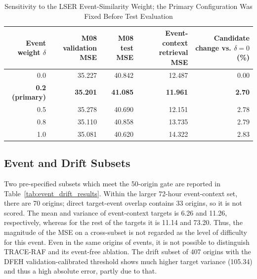 \documentclass{ieeeaccess}
\begin{document}
\begin{table}[!t]
\centering
\caption{Sensitivity to the LSER Event-Similarity Weight; the Primary
Configuration Was Fixed Before Test Evaluation}
\label{tab:event_weight_sensitivity}
\begin{tabular}{rrrrr}
\toprule
Event weight $\delta$ & M08 validation MSE & M08 test MSE & Event-context retrieval MSE & Candidate change vs. $\delta=0$ (\%) \\
\midrule
0.0 & 35.227 & 40.842 & 12.487 & 0.00 \\
\textbf{0.2 (primary)} & \textbf{35.201} & \textbf{41.085} & \textbf{11.961} & \textbf{2.70} \\
0.5 & 35.278 & 40.690 & 12.151 & 2.78 \\
0.8 & 35.110 & 40.858 & 13.735 & 2.79 \\
1.0 & 35.081 & 40.620 & 14.322 & 2.83 \\
\bottomrule
\end{tabular}
\end{table}

\subsection{Event and Drift Subsets}
Two pre-specified subsets which meet the 50-origin gate are reported in Table~\ref{tab:event_drift_results}. Within the larger 72-hour event-context set, there are 70 origins; direct target-event overlap contains 33 origins, so it is not scored. The mean and variance of event-context targets is 6.26 and 11.26, respectively, whereas for the rest of the targets it is 11.14 and 73.20. Thus, the magnitude of the MSE on a cross-subset is not regarded as the level of difficulty for this event. Even in the same origins of events, it is not possible to distinguish TRACE-RAF and its event-free ablation. The drift subset of 407 origins with the DFEH validation-calibrated threshold shows much higher target variance (105.34) and thus a high absolute error, partly due to that.
\end{document}
